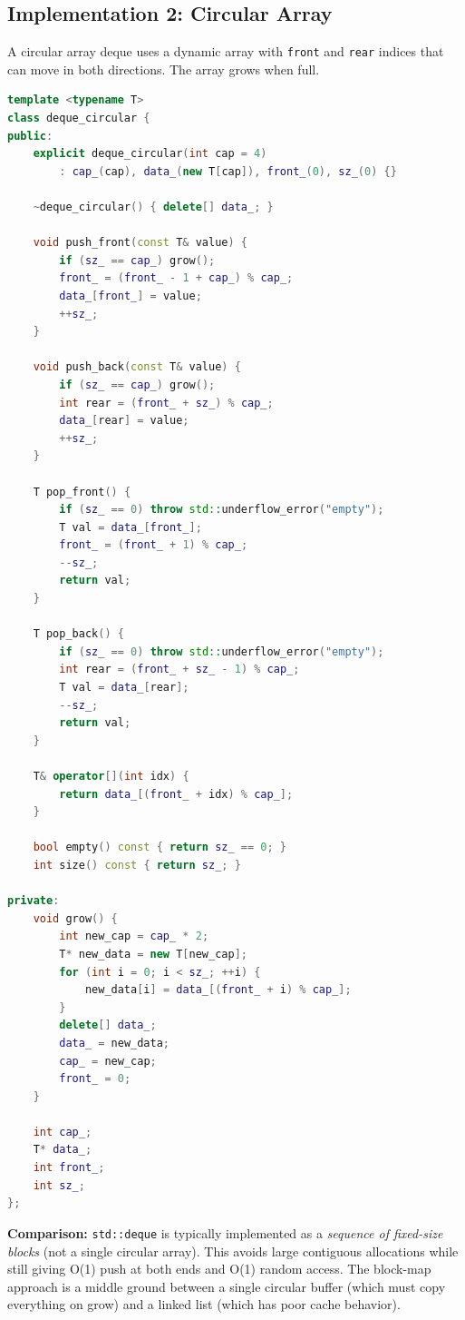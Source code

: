 \subsection{Implementation 2: Circular Array}

A circular array deque uses a dynamic array with \texttt{front} and \texttt{rear} indices that can move in both directions. The array grows when full.

\begin{lstlisting}[language=C++]
template <typename T>
class deque_circular {
public:
    explicit deque_circular(int cap = 4)
        : cap_(cap), data_(new T[cap]), front_(0), sz_(0) {}

    ~deque_circular() { delete[] data_; }

    void push_front(const T& value) {
        if (sz_ == cap_) grow();
        front_ = (front_ - 1 + cap_) % cap_;
        data_[front_] = value;
        ++sz_;
    }

    void push_back(const T& value) {
        if (sz_ == cap_) grow();
        int rear = (front_ + sz_) % cap_;
        data_[rear] = value;
        ++sz_;
    }

    T pop_front() {
        if (sz_ == 0) throw std::underflow_error("empty");
        T val = data_[front_];
        front_ = (front_ + 1) % cap_;
        --sz_;
        return val;
    }

    T pop_back() {
        if (sz_ == 0) throw std::underflow_error("empty");
        int rear = (front_ + sz_ - 1) % cap_;
        T val = data_[rear];
        --sz_;
        return val;
    }

    T& operator[](int idx) {
        return data_[(front_ + idx) % cap_];
    }

    bool empty() const { return sz_ == 0; }
    int size() const { return sz_; }

private:
    void grow() {
        int new_cap = cap_ * 2;
        T* new_data = new T[new_cap];
        for (int i = 0; i < sz_; ++i) {
            new_data[i] = data_[(front_ + i) % cap_];
        }
        delete[] data_;
        data_ = new_data;
        cap_ = new_cap;
        front_ = 0;
    }

    int cap_;
    T* data_;
    int front_;
    int sz_;
};
\end{lstlisting}

\textbf{Comparison:} \texttt{std::deque} is typically implemented as a \emph{sequence of fixed-size blocks} (not a single circular array). This avoids large contiguous allocations while still giving O(1) push at both ends and O(1) random access. The block-map approach is a middle ground between a single circular buffer (which must copy everything on grow) and a linked list (which has poor cache behavior).

